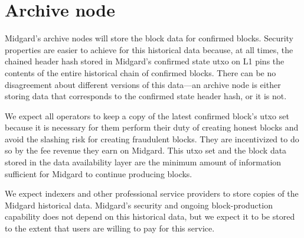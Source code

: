 \documentclass[../midgard.tex]{subfiles}
\begin{document}
\section{Archive node}
\label{h:archive-node}

Midgard's archive nodes will store the block data for confirmed blocks.
Security properties are easier to achieve for this historical data because, at all times, the chained header hash stored in Midgard's confirmed state utxo on L1 pins the contents of the entire historical chain of confirmed blocks.
There can be no disagreement about different versions of this data---an archive node is either storing data that corresponds to the confirmed state header hash, or it is not.

We expect all operators to keep a copy of the latest confirmed block's utxo set because it is necessary for them perform their duty of creating honest blocks and avoid the slashing risk for creating fraudulent blocks.
They are incentivized to do so by the fee revenue they earn on Midgard.
This utxo set and the block data stored in the data availability layer are the minimum amount of information sufficient for Midgard to continue producing blocks.

We expect indexers and other professional service providers to store copies of the Midgard historical data.
Midgard's security and ongoing block-production capability does not depend on this historical data, but we expect it to be stored to the extent that users are willing to pay for this service.
\end{document}
